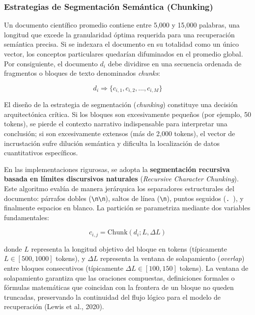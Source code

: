 \subsubsection{Estrategias de Segmentación Semántica (Chunking)}

Un documento científico promedio contiene entre 5,000 y 15,000 palabras, una longitud que excede la granularidad óptima requerida para una recuperación semántica precisa. Si se indexara el documento en su totalidad como un único vector, los conceptos particulares quedarían difuminados en el promedio global. Por consiguiente, el documento $d_i$ debe dividirse en una secuencia ordenada de fragmentos o bloques de texto denominados \textit{chunks}:

\begin{equation}
d_i \Longrightarrow \{c_{i,1}, c_{i,2}, \dots, c_{i,M}\}
\end{equation}

El diseño de la estrategia de segmentación (\textit{chunking}) constituye una decisión arquitectónica crítica. Si los bloques son excesivamente pequeños (por ejemplo, 50 tokens), se pierde el contexto narrativo indispensable para interpretar una conclusión; si son excesivamente extensos (más de 2,000 tokens), el vector de incrustación sufre dilución semántica y dificulta la localización de datos cuantitativos específicos.

En las implementaciones rigurosas, se adopta la \textbf{segmentación recursiva basada en límites discursivos naturales} (\textit{Recursive Character Chunking}). Este algoritmo evalúa de manera jerárquica los separadores estructurales del documento: párrafos dobles (\texttt{\textbackslash n\textbackslash n}), saltos de línea (\texttt{\textbackslash n}), puntos seguidos (\texttt{. }), y finalmente espacios en blanco. La partición se parametriza mediante dos variables fundamentales:

\begin{equation}
c_{i,j} = \mathrm{Chunk}(d_i; L, \Delta L)
\end{equation}

donde $L$ representa la longitud objetivo del bloque en tokens (típicamente $L \in [500, 1000]$ tokens), y $\Delta L$ representa la ventana de solapamiento (\textit{overlap}) entre bloques consecutivos (típicamente $\Delta L \in [100, 150]$ tokens). La ventana de solapamiento garantiza que las oraciones compuestas, definiciones formales o fórmulas matemáticas que coincidan con la frontera de un bloque no queden truncadas, preservando la continuidad del flujo lógico para el modelo de recuperación (Lewis et al., 2020).

